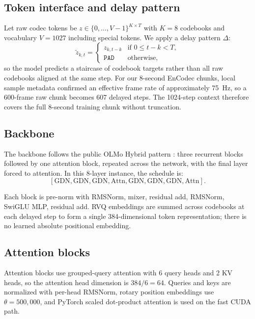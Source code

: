 \documentclass[11pt]{article}
\begin{document}
\subsection{Token interface and delay pattern}
Let raw codec tokens be $z \in \{0,\dots,V-1\}^{K \times T}$ with $K=8$ codebooks and vocabulary $V=1027$ including special tokens. We apply a delay pattern $\Delta$:
\[
\tilde{z}_{k,t} =
\begin{cases}
z_{k,t-k} & \text{if } 0 \le t-k < T,\\
\texttt{PAD} & \text{otherwise,}
\end{cases}
\]
so the model predicts a staircase of codebook targets rather than all raw codebooks aligned at the same step. For our 8-second EnCodec chunks, local sample metadata confirmed an effective frame rate of approximately 75~Hz, so a 600-frame raw chunk becomes 607 delayed steps. The 1024-step context therefore covers the full 8-second training chunk without truncation.

\subsection{Backbone}
The backbone follows the public OLMo Hybrid pattern \citep{merrill2026olmohybrid}: three recurrent blocks followed by one attention block, repeated across the network, with the final layer forced to attention. In this 8-layer instance, the schedule is:
\[
[\text{GDN}, \text{GDN}, \text{GDN}, \text{Attn}, \text{GDN}, \text{GDN}, \text{GDN}, \text{Attn}].
\]

Each block is pre-norm with RMSNorm, mixer, residual add, RMSNorm, SwiGLU MLP, residual add. RVQ embeddings are summed across codebooks at each delayed step to form a single 384-dimensional token representation; there is no learned absolute positional embedding.

\subsection{Attention blocks}
Attention blocks use grouped-query attention with 6 query heads and 2 KV heads, so the attention head dimension is $384 / 6 = 64$. Queries and keys are normalized with per-head RMSNorm, rotary position embeddings use $\theta = 500{,}000$, and PyTorch scaled dot-product attention is used on the fast CUDA path.
\end{document}
